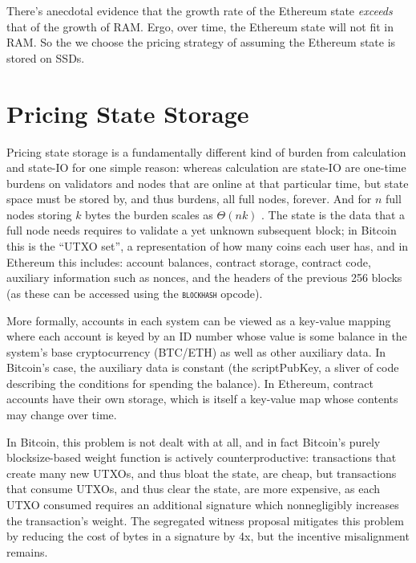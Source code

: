 \documentclass[12pt, final]{article}
\newcommand{\opcode}[1]{\textsc{\texttt{#1}}}
\begin{document}

There's anecdotal evidence that the growth rate of the Ethereum state \emph{exceeds} that of the growth of RAM.  Ergo, over time, the Ethereum state will not fit in RAM.  So the we choose the pricing strategy of assuming the Ethereum state is stored on SSDs.







\section{Pricing State Storage}
\label{sect:storage}

Pricing state storage is a fundamentally different kind of burden from calculation and state-IO for one simple reason: whereas calculation are state-IO are one-time burdens on validators and nodes that are online at that particular time, but state space must be stored by, and thus burdens, all full nodes, forever. And for $n$ full nodes storing $k$ bytes the burden scales as $\Theta(n k)$ . The state is the data that a full node needs requires to validate a yet unknown subsequent block; in Bitcoin this is the ``UTXO set'', a representation of how many coins each user has, and in Ethereum this includes: account balances, contract storage, contract code, auxiliary information such as nonces, and the headers of the previous 256 blocks (as these can be accessed using the \opcode{blockhash} opcode).

More formally, accounts in each system can be viewed as a key-value mapping where each account is keyed by an ID number whose value is some balance in the system's base cryptocurrency (BTC/ETH) as well as other auxiliary data. In Bitcoin's case, the auxiliary data is constant (the scriptPubKey, a sliver of code describing the conditions for spending the balance). In Ethereum, contract accounts have their own storage, which is itself a key-value map whose contents may change over time.

In Bitcoin, this problem is not dealt with at all, and in fact Bitcoin's purely blocksize-based weight function is actively counterproductive: transactions that create many new UTXOs, and thus bloat the state, are cheap, but transactions that consume UTXOs, and thus clear the state, are more expensive, as each UTXO consumed requires an additional signature which nonnegligibly increases the transaction's weight. The segregated witness proposal mitigates this problem by reducing the cost of bytes in a signature by 4x, but the incentive misalignment remains.
\end{document}
